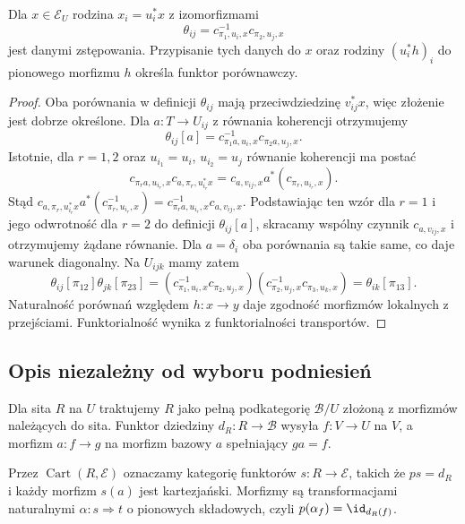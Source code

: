 \begin{stwierdzenie}\label{cat:prop:fibered-descent-comparison}
Dla $x\in\mathcal E_U$ rodzina $x_i=u_i^*x$ z izomorfizmami
\[
 \theta_{ij}=c_{\pi_1,u_i,x}^{-1}c_{\pi_2,u_j,x}
\]
jest danymi zstępowania. Przypisanie tych danych do $x$ oraz rodziny $(u_i^*h)_i$ do pionowego morfizmu $h$ określa funktor porównawczy.
\end{stwierdzenie}
\begin{proof}
Oba porównania w definicji $\theta_{ij}$ mają przeciwdziedzinę $v_{ij}^*x$, więc złożenie jest dobrze określone. Dla $a:T\to U_{ij}$ z równania koherencji otrzymujemy
\[
 \theta_{ij}[a]=c_{\pi_1a,u_i,x}^{-1}c_{\pi_2a,u_j,x}.
\]
Istotnie, dla $r=1,2$ oraz $u_{i_1}=u_i$, $u_{i_2}=u_j$ równanie koherencji ma postać
\[
 c_{\pi_ra,u_{i_r},x}c_{a,\pi_r,u_{i_r}^*x}
 =c_{a,v_{ij},x}a^*(c_{\pi_r,u_{i_r},x}).
\]
Stąd $c_{a,\pi_r,u_{i_r}^*x}a^*(c_{\pi_r,u_{i_r},x}^{-1})
 =c_{\pi_ra,u_{i_r},x}^{-1}c_{a,v_{ij},x}$.
Podstawiając ten wzór dla $r=1$ i jego odwrotność dla $r=2$ do definicji $\theta_{ij}[a]$, skracamy wspólny czynnik $c_{a,v_{ij},x}$ i otrzymujemy żądane równanie. Dla $a=\delta_i$ oba porównania są takie same, co daje warunek diagonalny. Na $U_{ijk}$ mamy zatem
\[
 \theta_{ij}[\pi_{12}]\theta_{jk}[\pi_{23}]
 =(c_{\pi_1,u_i,x}^{-1}c_{\pi_2,u_j,x})
   (c_{\pi_2,u_j,x}^{-1}c_{\pi_3,u_k,x})
 =\theta_{ik}[\pi_{13}].
\]
Naturalność porównań względem $h:x\to y$ daje zgodność morfizmów lokalnych z przejściami. Funktorialność wynika z funktorialności transportów.
\end{proof}

\subsection{Opis niezależny od wyboru podniesień}

Dla sita $R$ na $U$ traktujemy $R$ jako pełną podkategorię $\mathcal B/U$ złożoną z morfizmów należących do sita. Funktor dziedziny $d_R:R\to\mathcal B$ wysyła $f:V\to U$ na $V$, a morfizm $a:f\to g$ na morfizm bazowy $a$ spełniający $ga=f$.

\begin{definicja}\label{cat:def:descent-sieve-section}
Przez $\operatorname{Cart}(R,\mathcal E)$ oznaczamy kategorię funktorów $s:R\to\mathcal E$, takich że $ps=d_R$ i każdy morfizm $s(a)$ jest kartezjański. Morfizmy są transformacjami naturalnymi $\alpha:s\Rightarrow t$ o pionowych składowych, czyli $p(\alpha_f)=\id_{d_R(f)}$.
\end{definicja}

